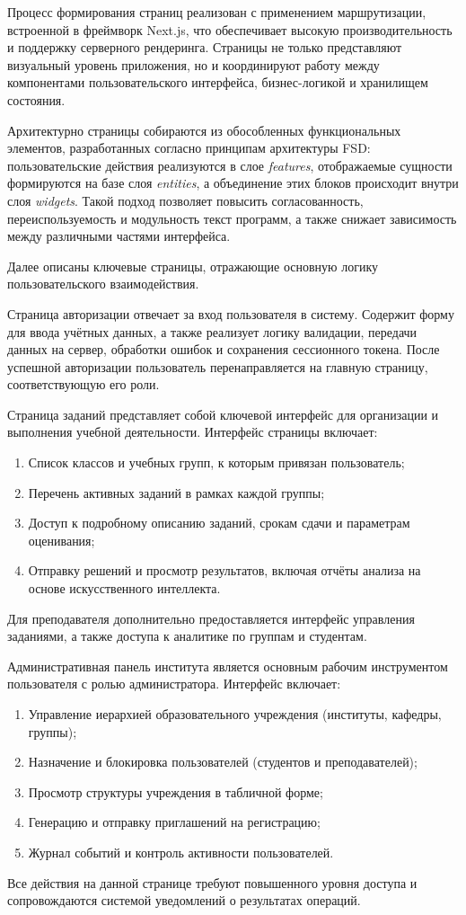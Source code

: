 Процесс формирования страниц реализован с применением маршрутизации, встроенной в фреймворк Next.js, что обеспечивает высокую производительность и поддержку серверного рендеринга. Страницы не только представляют визуальный уровень приложения, но и координируют работу между компонентами пользовательского интерфейса, бизнес-логикой и хранилищем состояния.

Архитектурно страницы собираются из обособленных функциональных элементов, разработанных согласно принципам архитектуры FSD: пользовательские действия реализуются в слое \textit{features}, отображаемые сущности формируются на базе слоя \textit{entities}, а объединение этих блоков происходит внутри слоя \textit{widgets}. Такой подход позволяет повысить согласованность, переиспользуемость и модульность текст программ, а также снижает зависимость между различными частями интерфейса.

Далее описаны ключевые страницы, отражающие основную логику пользовательского взаимодействия.

Страница авторизации отвечает за вход пользователя в систему. Содержит форму для ввода учётных данных, а также реализует логику валидации, передачи данных на сервер, обработки ошибок и сохранения сессионного токена. После успешной авторизации пользователь перенаправляется на главную страницу, соответствующую его роли.

Страница заданий представляет собой ключевой интерфейс для организации и выполнения учебной деятельности. Интерфейс страницы включает:
\begin{enumerate}
\item Список классов и учебных групп, к которым привязан пользователь;
\item Перечень активных заданий в рамках каждой группы;
\item Доступ к подробному описанию заданий, срокам сдачи и параметрам оценивания;
\item Отправку решений и просмотр результатов, включая отчёты анализа на основе искусственного интеллекта.
\end{enumerate}
Для преподавателя дополнительно предоставляется интерфейс управления заданиями, а также доступа к аналитике по группам и студентам.

Административная панель института является основным рабочим инструментом пользователя с ролью администратора. Интерфейс включает:
\begin{enumerate}
\item Управление иерархией образовательного учреждения (институты, кафедры, группы);
\item Назначение и блокировка пользователей (студентов и преподавателей);
\item Просмотр структуры учреждения в табличной форме;
\item Генерацию и отправку приглашений на регистрацию;
\item Журнал событий и контроль активности пользователей.
\end{enumerate}
Все действия на данной странице требуют повышенного уровня доступа и сопровождаются системой уведомлений о результатах операций.

